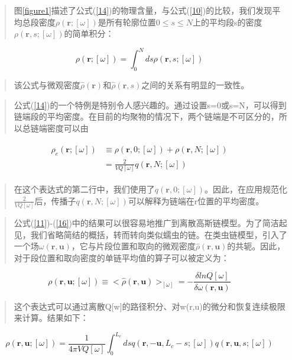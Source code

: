 \begin{quotation}
	图\ref{figure1}描述了公式(\ref{14})的物理含量，与公式(\ref{10})的比较，我们发现平均总段密度$\rho(\mathbf{r};[\omega])$是所有轮廓位置$0\le s\le N$上的平均段s的密度$\rho(\mathbf{r},s;[\omega])$的简单积分：
\end{quotation}
\begin{equation}\label{15}
\rho(\mathbf{r};[\omega])=\int_{0}^{N}ds\rho(\mathbf{r},s;[\omega])
\end{equation}
\begin{quotation}
	该公式与微观密度$\hat{\rho}(\mathbf{r})$和$\hat{\rho}(\mathbf{r},s)$之间的关系有明显的一致性。
\end{quotation}
\begin{quotation}
	公式(\ref{14})的一个特例是特别令人感兴趣的。通过设置s=0或s=N，可以得到链端段的平均密度。在目前的均聚物的情况下，两个链端是不可区分的，所以总链端密度可以由
\end{quotation}
\begin{align}\label{16}
\begin{split}
\rho_e(\mathbf{r};[\omega])&\equiv \rho(\mathbf{r},0;[\omega])+\rho(\mathbf{r},N;[\omega])\\  &=\frac{2}{VQ[\omega]}q(\mathbf{r},N;[\omega])
\end{split}
\end{align}
\begin{quotation}
	在这个表达式的第二行中，我们使用了$q(\mathbf{r},0;[\omega])$。因此，在应用规范化$\frac{2}{VQ[\omega]}$后，传播子$q(\mathbf{r},N;[\omega])$可以解释为链端在r位置的平均密度。
\end{quotation}
\begin{quotation}
	公式(\ref{11})-(\ref{16})中的结果可以很容易地推广到离散高斯链模型。为了简洁起见，我们省略简结的概括，转而转向类似蠕虫的链。在类虫链模型，引入了一个场$\omega(\mathbf{r},\mathbf{u})$，它与片段位置和取向的微观密度$\hat{\rho}(\mathbf{r},\mathbf{u})$的共轭。因此，对于段位置和取向密度的单链平均值的算子可以被定义为：
\end{quotation}
\begin{equation}\label{17}
\rho(\mathbf{r},\mathbf{u};[\omega])\equiv <\hat{\rho}(\mathbf{r},\mathbf{u})>_[\omega]=-\frac{\delta lnQ[\omega]}{\delta \omega(\mathbf{r},\mathbf{u})}
\end{equation}
\begin{quotation}
	这个表达式可以通过离散Q[w]的路径积分、对w(r,u)的微分和恢复连续极限来计算。结果如下：
\end{quotation}
\begin{equation}\label{18}
\rho(\mathbf{r},\mathbf{u};[\omega])=\frac{1}{4\pi VQ[\omega]}\int_{0}^{L_c}ds q(\mathbf{r},-\mathbf{u},L_c-s;[\omega])q(\mathbf{r},\mathbf{u},s;[\omega])
\end{equation}
